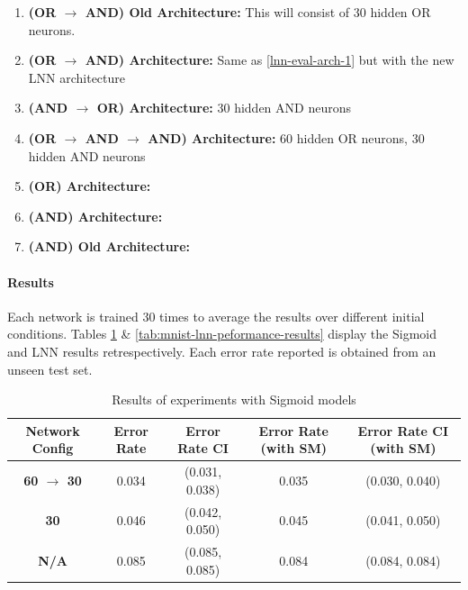 \begin{enumerate}
	\item \textbf{(OR $\rightarrow$ AND) Old Architecture:} This will consist of 30 hidden OR neurons. \label{lnn-eval-arch-1}
	\item \textbf{(OR $\rightarrow$ AND) Architecture:} Same as \ref{lnn-eval-arch-1} but with the new LNN architecture \label{lnn-eval-arch-2}
	\item \textbf{(AND $\rightarrow$ OR) Architecture:} 30 hidden AND neurons \label{lnn-eval-arch-3}
	\item \textbf{(OR $\rightarrow$ AND $\rightarrow$ AND) Architecture: } 60 hidden OR neurons, 30 hidden AND neurons\label{lnn-eval-arch-4}
	\item \textbf{(OR) Architecture:} \label{lnn-eval-arch-5}
	\item \textbf{(AND) Architecture:} \label{lnn-eval-arch-6}
	\item \textbf{(AND) Old Architecture:} \label{lnn-eval-arch-7}
\end{enumerate}

\paragraph{Results}
Each network is trained 30 times to average the results over different initial conditions. Tables \ref{tab:mnist-sigmoid-peformance-results} \& \ref{tab:mnist-lnn-peformance-results} display the Sigmoid and LNN results retrespectively. Each error rate reported is obtained from an unseen test set.

\begin{table}[H]
	\begin{center}
		\begin{tabular}{| c | c | c | c | c |}
			\hline
			\textbf{Network Config} & \textbf{Error Rate} & \textbf{Error Rate CI} & \textbf{Error Rate (with SM)} & \textbf{Error Rate CI (with SM)}\\
			\hline
			\hline
			\textbf{60 $\rightarrow$ 30} & 0.034 & (0.031, 0.038) & 0.035 & (0.030, 0.040)\\
			\textbf{30} & 0.046 & (0.042, 0.050) & 0.045 & (0.041, 0.050)\\
			\textbf{N/A} & 0.085 & (0.085, 0.085) & 0.084 & (0.084, 0.084)\\
			\hline
		\end{tabular}
	\end{center}
	\caption{Results of experiments with Sigmoid models}
	\label{tab:mnist-sigmoid-peformance-results}
\end{table}


